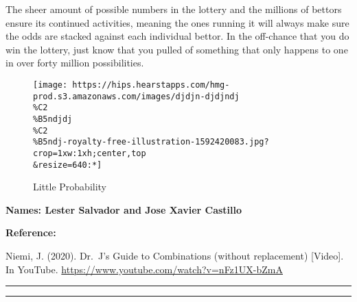 \documentclass[
]{article}
\begin{document}
The sheer amount of possible numbers in the lottery and the millions of
bettors ensure its continued activities, meaning the ones running it
will always make sure the odds are stacked against each individual
bettor. In the off-chance that you do win the lottery, just know that
you pulled of something that only happens to one in over forty million
possibilities.

\begin{figure}
\centering
\texttt{[image: https://hips.hearstapps.com/hmg-prod.s3.amazonaws.com/images/djdjn-djdjndj\\\%C2\\\%B5ndjdj\\\%C2\\\%B5ndj-royalty-free-illustration-1592420083.jpg?crop=1xw:1xh;center,top\\\&resize=640:*]}
\caption{Little Probability}
\end{figure}

\textbf{Names: Lester Salvador and Jose Xavier Castillo}

\textbf{Reference:}

Niemi, J. (2020). Dr.~J's Guide to Combinations (without replacement)
{[}Video{]}. In YouTube.
\url{https://www.youtube.com/watch?v=nFz1UX-bZmA}

\begin{center}\rule{0.5\linewidth}{0.5pt}\end{center}

\begin{center}\rule{0.5\linewidth}{0.5pt}\end{center}
\end{document}
